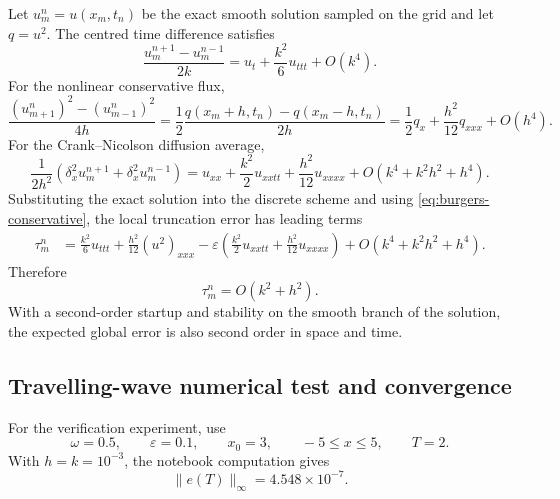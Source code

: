 \documentclass[11pt]{article}
\begin{document}
Let $u_m^n=u(x_m,t_n)$ be the exact smooth solution sampled on the grid and let $q=u^2$.  The centred time difference satisfies
\begin{equation}
    \frac{u_m^{n+1}-u_m^{n-1}}{2k}
    =
    u_t+\frac{k^2}{6}u_{ttt}+O(k^4).
\end{equation}
For the nonlinear conservative flux,
\begin{equation}
    \frac{(u_{m+1}^n)^2-(u_{m-1}^n)^2}{4h}
    =
    \frac{1}{2}\frac{q(x_m+h,t_n)-q(x_m-h,t_n)}{2h}
    =
    \frac{1}{2}q_x+\frac{h^2}{12}q_{xxx}+O(h^4).
\end{equation}
For the Crank--Nicolson diffusion average,
\begin{equation}
    \frac{1}{2h^2}
    \left(
    \delta_x^2 u_m^{n+1}
    +
    \delta_x^2 u_m^{n-1}
    \right)
    =
    u_{xx}
    +
    \frac{k^2}{2}u_{xxtt}
    +
    \frac{h^2}{12}u_{xxxx}
    +
    O(k^4+k^2h^2+h^4).
\end{equation}
Substituting the exact solution into the discrete scheme and using \eqref{eq:burgers-conservative}, the local truncation error has leading terms
\begin{equation}
\begin{aligned}
    \tau_m^n
    &=
    \frac{k^2}{6}u_{ttt}
    +\frac{h^2}{12}(u^2)_{xxx}
    -\varepsilon
    \left(
    \frac{k^2}{2}u_{xxtt}
    +
    \frac{h^2}{12}u_{xxxx}
    \right)
    +O(k^4+k^2h^2+h^4).
\end{aligned}
\end{equation}
Therefore
\begin{equation}
    \tau_m^n=O(k^2+h^2).
\end{equation}
With a second-order startup and stability on the smooth branch of the solution, the expected global error is also second order in space and time.

\subsection{Travelling-wave numerical test and convergence}

For the verification experiment, use
\begin{equation}
    \omega=0.5,\qquad
    \varepsilon=0.1,\qquad
    x_0=3,\qquad
    -5\le x\le 5,\qquad
    T=2.
\end{equation}
With $h=k=10^{-3}$, the notebook computation gives
\begin{equation}
    \|e(T)\|_{\infty}=4.548\times 10^{-7}.
\end{equation}
\end{document}
